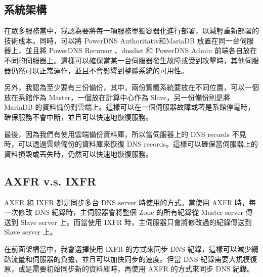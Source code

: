 \documentclass[12pt]{article}
\begin{document}
\subsection{系統架構}
在眾多服務當中，我認為要將每一項服務單獨容器化進行部署，以減輕重新部署的技術成本。同時，可以將 PowerDNS Authoritativ和MariaDB 放置在同一台伺服器上，並且將 PowerDNS Recursor 、dnsdist 和 PowerDNS Admin 前端各自放在不同的伺服器上。這樣可以確保當某一台伺服器發生故障或受到攻擊時，其他伺服器仍然可以正常運作，並且不會影響到整體系統的可用性。

另外，我認為至少要有三份備份，其中，兩份實體系統要放在不同位置，可以一個放在系館作為 Master，一個放在計算中心作為 Slave，另一份備份則是將 MariaDB 的資料備份到雲端上。這樣可以在一個伺服器故障或著是系館停電時，確保服務不會中斷，並且可以快速地恢復服務。

最後，因為我們有使用雲端備份資料庫，所以當伺服器上的 DNS records 不見時，可以透過雲端備份的資料庫來恢復 DNS records。這樣可以確保當伺服器上的資料損毀或丟失時，仍然可以快速地恢復服務。

\subsection{AXFR v.s. IXFR}
AXFR 和 IXFR 都是同步多台 DNS server 時使用的方式。當使用 AXFR 時，每一次修改 DNS 紀錄時，主伺服器會將整個 Zone 的所有紀錄從 Master server 傳送到 Slave server 上。而當使用 IXFR 時，主伺服器只會將修改過的紀錄傳送到 Slave server 上。

在前面架構當中，我會選擇使用 IXFR 的方式來同步 DNS 紀錄，這樣可以減少網路流量和伺服器的負擔，並且可以加快同步的速度。但當 DNS 紀錄需要大規模復原，或是需要初始同步新的資料庫時，再使用 AXFR 的方式來同步 DNS 紀錄。
\end{document}
